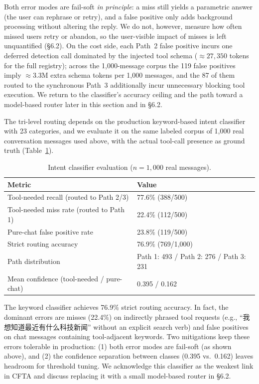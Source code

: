 \documentclass[numbered,mediumone,traditional]{oup-authoring-template}
\begin{document}
Both error modes are fail-soft \emph{in principle}: a miss still yields a parametric answer (the user can rephrase or retry), and a false positive only adds background processing without altering the reply. We do not, however, measure how often missed users retry or abandon, so the user-visible impact of misses is left unquantified (\S6.2). On the cost side, each Path~2 false positive incurs one deferred detection call dominated by the injected tool schema ($\approx 27{,}350$ tokens for the full registry); across the 1{,}000-message corpus the 119 false positives imply $\approx$3.3M extra schema tokens per 1{,}000 messages, and the 87 of them routed to the synchronous Path~3 additionally incur unnecessary blocking tool execution. We return to the classifier's accuracy ceiling and the path toward a model-based router later in this section and in \S6.2.

The tri-level routing depends on the production keyword-based intent classifier with 23 categories, and we evaluate it on the same labeled corpus of 1,000 real conversation messages used above, with the actual tool-call presence as ground truth (Table~\ref{tab:classifier}).

\begin{table}[htbp]
\caption{Intent classifier evaluation ($n = 1{,}000$ real messages).}
\label{tab:classifier}
\centering
\small
\begin{tabular}{@{}ll@{}}
\toprule
Metric & Value \\
\midrule
Tool-needed recall (routed to Path 2/3) & 77.6\% (388/500) \\
Tool-needed miss rate (routed to Path 1) & 22.4\% (112/500) \\
Pure-chat false positive rate & 23.8\% (119/500) \\
Strict routing accuracy & 76.9\% (769/1,000) \\
Path distribution & Path 1: 493 / Path 2: 276 / Path 3: 231 \\
Mean confidence (tool-needed / pure-chat) & 0.395 / 0.162 \\
\bottomrule
\end{tabular}
\end{table}

The keyword classifier achieves 76.9\% strict routing accuracy. In fact, the dominant errors are misses (22.4\%) on indirectly phrased tool requests (e.g., ``我想知道最近有什么科技新闻'' without an explicit search verb) and false positives on chat messages containing tool-adjacent keywords. Two mitigations keep these errors tolerable in production: (1) both error modes are fail-soft (as shown above), and (2) the confidence separation between classes (0.395 vs.\ 0.162) leaves headroom for threshold tuning. We acknowledge this classifier as the weakest link in CFTA and discuss replacing it with a small model-based router in \S6.2.
\end{document}
